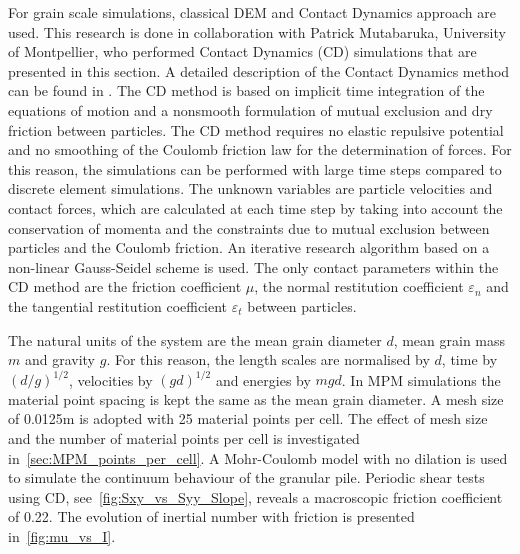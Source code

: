 For grain scale simulations, classical DEM and Contact Dynamics approach are 
used. This research is done in collaboration with Patrick Mutabaruka, 
University of Montpellier, who performed Contact Dynamics (CD) simulations that 
are 
presented in this section. A detailed description of the Contact Dynamics 
method can be found in \cite{Moreau1993,Jean1999,Radjai2009,Radjai2011}. 
The CD method is based on implicit time integration of the equations of motion 
and a nonsmooth formulation of mutual exclusion and dry friction between 
particles. The CD method requires no elastic repulsive potential and no 
smoothing of the Coulomb friction law for the determination of forces. 
For this reason, the simulations can be performed with large time steps 
compared to discrete element simulations. The unknown variables are particle 
velocities and contact forces, which are calculated at each time step by taking 
into account the conservation of momenta and the constraints due to mutual 
exclusion between particles and the Coulomb friction. An iterative 
research algorithm based on a non-linear Gauss-Seidel scheme is used. The only 
contact 
parameters within the CD method are the friction coefficient $\mu$, the 
normal restitution coefficient $\varepsilon_n$ and the tangential restitution 
coefficient 
$\varepsilon_t$ between particles. 

The natural units of the system are the mean grain diameter $d$, mean grain 
mass $m$ and gravity $g$. For this reason, the length scales are normalised 
by $d$, time by $(d/g)^{1/2}$, velocities by $(gd)^{1/2}$ and energies by 
$mgd$. In MPM simulations the material point spacing is kept the same as the 
mean grain diameter. A mesh size of 0.0125m is adopted with 25 material points 
per cell. The effect of mesh size and the number of material points per cell is 
investigated in~\cref{sec:MPM_points_per_cell}. A Mohr-Coulomb model with no 
dilation is used to simulate the continuum behaviour of the granular pile. 
Periodic shear tests using CD, see~\cref{fig:Sxy_vs_Syy_Slope}, reveals a 
macroscopic friction coefficient of 0.22. The evolution of inertial number with 
friction is presented in~\cref{fig:mu_vs_I}.

